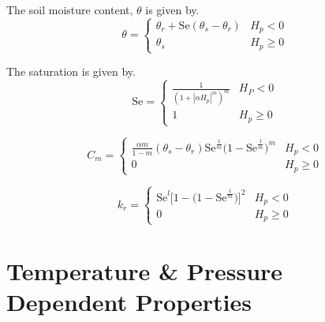 \documentclass[../thesis.tex]{subfiles}
\begin{document}
The soil moisture content, $\theta$ is given by.
\begin{equation}
  \theta = \begin{cases}
    \theta_r + \mathrm{Se}(\theta_s - \theta_r) & H_p < 0 \\
    \theta_s & H_p \geq 0
\end{cases}
\end{equation}

The saturation is given by.
\begin{equation}
  \mathrm{Se} = \begin{cases}
    \frac{1}{(1 + |\alpha H_p|^m)^m} & H_P < 0 \\
    1 & H_p \geq 0
  \end{cases}
\end{equation}

\begin{equation}
  C_m = \begin{cases}
    \frac{\alpha m}{1-m}(\theta_s - \theta_r)\mathrm{Se}^{\frac{1}{m}}\big( 1 - \mathrm{Se}^{\frac{1}{m}} \big)^m & H_p < 0 \\
    0 & H_p \geq 0
  \end{cases}
\end{equation}

\begin{equation}
  k_r = \begin{cases}
    \mathrm{Se}^l \big[ 1 - \big( 1 - \mathrm{Se}^\frac{1}{m} \big) \big]^2 & H_p < 0 \\
    0 & H_p \geq 0
  \end{cases}
\end{equation}

\section{Temperature \& Pressure Dependent Properties}
\end{document}
